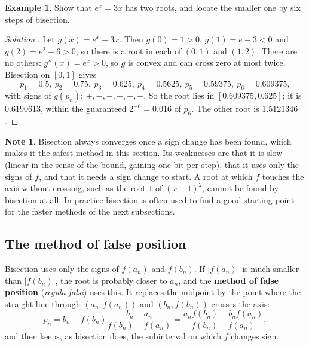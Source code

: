 \documentclass[11pt,a4paper]{article}
\numberwithin{equation}{section}
\theoremstyle{definition}
\newtheorem{exa}[thm]{Example}
\newtheorem*{note}{Note}
\newenvironment{solution}
  {\renewcommand{\qedsymbol}{}\begin{proof}[\textit{Solution}.]}
  {\end{proof}}
\begin{document}
\begin{exa}
\label{exa:ex3x}
Show that $e^x = 3x$ has two roots, and locate the smaller one by six steps of bisection.
\end{exa}

\begin{solution}
Let $g(x) = e^x-3x$. Then $g(0) = 1>0$, $g(1) = e-3<0$ and $g(2) = e^2-6>0$, so there is a root in each of $(0,1)$ and $(1,2)$. There are
no others: $g''(x) = e^x>0$, so $g$ is convex and can cross zero at most twice. Bisection on $[0,1]$ gives
$$p_1 = 0.5,\ p_2 = 0.75,\ p_3 = 0.625,\ p_4 = 0.5625,\ p_5 = 0.59375,\ p_6 = 0.609375,$$
with signs of $g(p_n)$: $+,-,-,+,+,+$. So the root lies in $[0.609375, 0.625]$; it is $0.6190613$, within the guaranteed
$2^{-6} = 0.016$ of $p_6$. The other root is $1.5121346$.
\end{solution}

\begin{note}
Bisection always converges once a sign change has been found, which makes it the safest method in this section. Its weaknesses are that
it is slow (linear in the sense of the bound, gaining one bit per step), that it uses only the signs of $f$, and that it needs a sign
change to start. A root at which $f$ touches the axis without crossing, such as the root $1$ of $(x-1)^2$, cannot be found by bisection
at all. In practice bisection is often used to find a good starting point for the faster methods of the next subsections.
\end{note}


\subsection{The method of false position}
\label{sec:falsepos}

Bisection uses only the signs of $f(a_n)$ and $f(b_n)$. If $|f(a_n)|$ is much smaller than $|f(b_n)|$, the root is probably closer to
$a_n$, and the \textbf{method of false position} (\emph{regula falsi}) uses this. It replaces the midpoint by the point where the
straight line through $(a_n,f(a_n))$ and $(b_n,f(b_n))$ crosses the axis:
\begin{equation}\label{eq:falsepos}
p_n = b_n-f(b_n)\frac{b_n-a_n}{f(b_n)-f(a_n)} = \frac{a_nf(b_n)-b_nf(a_n)}{f(b_n)-f(a_n)},
\end{equation}
and then keeps, as bisection does, the subinterval on which $f$ changes sign.
\end{document}
